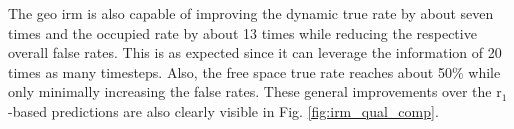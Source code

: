 The geo \gls{irm} is also capable of improving the dynamic true rate by about seven times and the occupied rate by about 13 times while reducing the respective overall false rates. This is as expected since it can leverage the information of 20 times as many timesteps. Also, the free space true rate reaches about 50$\%$ while only minimally increasing the false rates. These general improvements over the \gls{r}$_1$-based predictions are also clearly visible in Fig. \ref{fig:irm_qual_comp}.
\begin{center}
\end{center}
%
